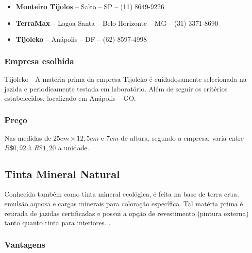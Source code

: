 	\begin{itemize}

		\item \textbf{Monteiro Tijolos} – Salto – SP – (11) 8649-9226

		\item \textbf{TerraMax} – Lagoa Santa – Belo Horizonte – MG – (31) 3371-8690

		\item \textbf{Tijoleko} – Anápolis – DF – (62) 8597-4998


	\end{itemize}

\subsubsection*{\textbf{Empresa esolhida}}
	
	Tijoleko - A matéria prima da empresa Tijoleko é cuidadosamente selecionada na jazida e periodicamente testada em laboratório. Além de seguir os critérios estabelecidos, localizado em Anápolis – GO.


\subsubsection*{\textbf{Preço}}

	Nas medidas de $25 cm \times 12,5 cm$ e $7 cm$ de altura, segundo a empresa, varia entre $R\$ 0,92$ à $R\$ 1,20$ a unidade.


\subsection{Tinta Mineral Natural}
	
	Conhecida também como tinta mineral ecológica, é feita na base de terra crua, emulsão aquosa e cargas minerais para coloração específica. Tal matéria prima é retirada de jazidas certificadas e possui a opção de revestimento (pintura externa) tanto quanto tinta para interiores. \cite{EcoCasa}.

\subsubsection*{\textbf{Vantagens}}
	
